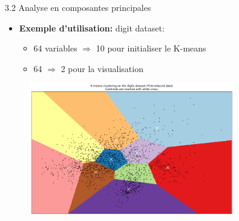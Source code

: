 \begin{frame}{3.2 Analyse en composantes principales}
  \begin{itemize}
  \item \textbf{Exemple d'utilisation:} digit dataset:
    \begin{itemize}
      \normalsize
    \item 64 variables $\Rightarrow$ 10 pour initialiser le K-means
    \item 64 $\Rightarrow$ 2 pour la visualisation
    \end{itemize}
  \end{itemize}
  \begin{figure}
    \includegraphics[width=0.8\textwidth]{fig/PCA.png}
  \end{figure}
\end{frame}
